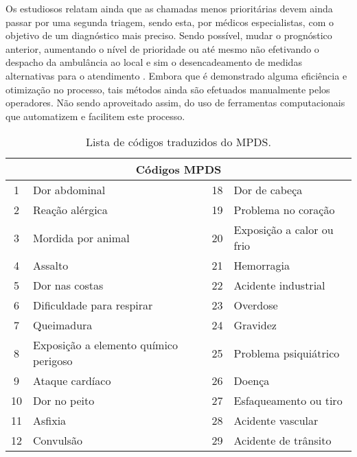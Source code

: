 Os estudiosos relatam ainda que as chamadas menos prioritárias devem ainda passar por uma segunda triagem, sendo esta, por médicos especialistas, com o objetivo de um diagnóstico mais preciso. Sendo possível, mudar o prognóstico anterior, aumentando o nível de prioridade ou até mesmo não efetivando o despacho da ambulância ao local e sim o desencadeamento de medidas alternativas para o atendimento \citep{marks2002emergency, gray2008ampds}. Embora que é demonstrado alguma eficiência e otimização no processo, tais métodos ainda são efetuados manualmente pelos operadores. Não sendo aproveitado assim, do uso de ferramentas computacionais que automatizem e facilitem este processo.

\begin{table}[ht!]
\caption{Lista de códigos traduzidos do MPDS.}
\label{tab:mpdsCodes}
\centering
\begin{tabular}{@{}clcl@{}}
\toprule
\multicolumn{4}{c}{\textbf{Códigos MPDS}}                                        \\ \midrule
1  & Dor abdominal                         & 18 & Dor de cabeça             \\ \midrule
2  & Reação alérgica                       & 19 & Problema no coração       \\ \midrule
3  & Mordida por animal                    & 20 & Exposição a calor ou frio \\ \midrule
4  & Assalto                               & 21 & Hemorragia                \\ \midrule
5  & Dor nas costas                        & 22 & Acidente industrial       \\ \midrule
6  & Dificuldade para respirar             & 23 & Overdose                  \\ \midrule
7  & Queimadura                            & 24 & Gravidez                  \\ \midrule
8  & Exposição a elemento químico perigoso & 25 & Problema psiquiátrico     \\ \midrule
9  & Ataque cardíaco                       & 26 & Doença                    \\ \midrule
10 & Dor no peito                          & 27 & Esfaqueamento ou tiro     \\ \midrule
11 & Asfixia                               & 28 & Acidente vascular         \\ \midrule
12 & Convulsão                             & 29 & Acidente de trânsito      \\ \midrule

\end{tabular}
\end{table}
